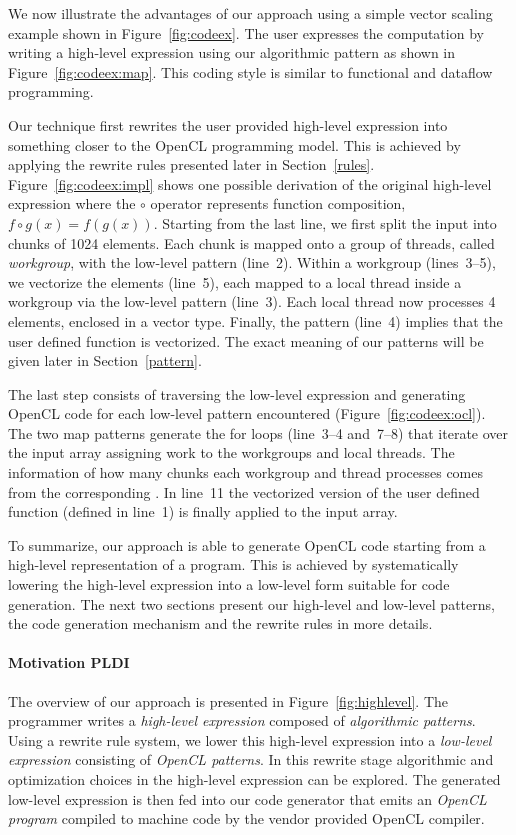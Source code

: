 We now illustrate the advantages of our approach using a simple vector scaling example shown in Figure~\ref{fig:codeex}.
The user expresses the computation by writing a high-level expression using our  algorithmic pattern as shown in Figure~\ref{fig:codeex:map}.
This coding style is similar to functional and dataflow programming.

Our technique first rewrites the user provided high-level expression into something closer to the OpenCL programming model.
This is achieved by applying the rewrite rules presented later in Section~\ref{rules}.
Figure~\ref{fig:codeex:impl} shows one possible derivation of the original high-level expression where the $\circ$ operator represents function composition, \ie $f \circ g(x) = f(g(x))$.
Starting from the last line, we first split the input into chunks of 1024 elements.
Each chunk is mapped onto a group of threads, called \emph{workgroup}, with the  low-level pattern (line~2).
Within a workgroup (lines~3--5), we vectorize the elements (line~5), each mapped to a local thread inside a workgroup via the  low-level pattern (line~3).
Each local thread now processes 4 elements, enclosed in a vector type.
Finally, the  pattern (line~4) implies that the user defined function  is vectorized.
The exact meaning of our patterns will be given later in Section~\ref{pattern}.

The last step consists of traversing the low-level expression and generating OpenCL code for each low-level pattern encountered (Figure~\ref{fig:codeex:ocl}).
The two map patterns generate the for loops (line~3--4 and~7--8) that iterate over the input array assigning work to the workgroups and local threads.
The information of how many chunks each workgroup and thread processes comes from the corresponding .
In line~11 the vectorized version of the user defined  function (defined in line~1) is finally applied to the input array.

To summarize, our approach is able to generate OpenCL code starting from a high-level representation of a program.
This is achieved by systematically lowering the high-level expression into a low-level form suitable for code generation.
The next two sections present our high-level and low-level patterns, the code generation mechanism and the rewrite rules in more details.

\paragraph{Motivation PLDI}
The overview of our approach is presented in Figure~\ref{fig:highlevel}.
The programmer writes a \emph{high-level expression} composed of \emph{algorithmic patterns}.
Using a rewrite rule system, we lower this high-level expression into a \emph{low-level expression} consisting of \emph{OpenCL patterns}.
In this rewrite stage algorithmic and optimization choices in the high-level expression can be explored.
The generated low-level expression is then fed into our code generator that emits an \emph{OpenCL program} compiled to machine code by the vendor provided OpenCL compiler.

